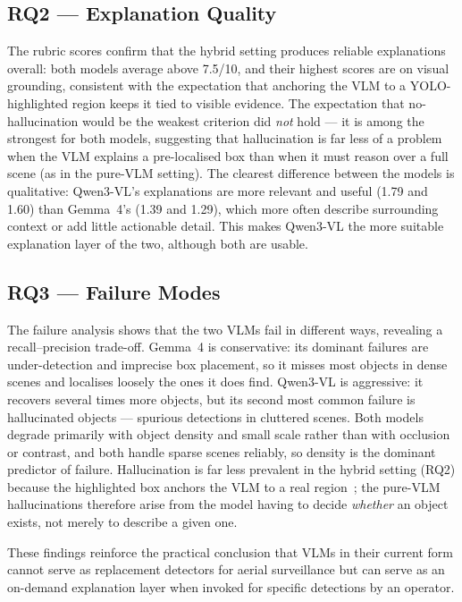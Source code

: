 \documentclass[acmtog, authorversion]{acmart}
\begin{document}
\subsection{RQ2 --- Explanation Quality}

The rubric scores confirm that the hybrid setting produces reliable
explanations overall: both models average above 7.5/10, and their
highest scores are on visual grounding, consistent with the
expectation that anchoring the VLM to a YOLO-highlighted region keeps
it tied to visible evidence. The expectation that no-hallucination
would be the weakest criterion did \emph{not} hold --- it is among the
strongest for both models, suggesting that hallucination is far less of
a problem when the VLM explains a pre-localised box than when it must
reason over a full scene (as in the pure-VLM setting). The clearest
difference between the models is qualitative: Qwen3-VL's explanations
are more relevant and useful (1.79 and 1.60) than Gemma~4's (1.39 and
1.29), which more often describe surrounding context or add little
actionable detail. This makes Qwen3-VL the more suitable explanation
layer of the two, although both are usable.

\subsection{RQ3 --- Failure Modes}

The failure analysis shows that the two VLMs fail in different ways,
revealing a recall--precision trade-off. Gemma~4 is conservative: its
dominant failures are under-detection and imprecise box placement, so
it misses most objects in dense scenes and localises loosely the ones
it does find. Qwen3-VL is aggressive: it recovers several times more
objects, but its second most common failure is hallucinated objects ---
spurious detections in cluttered scenes. Both models degrade primarily
with object density and small scale rather than with occlusion or
contrast, and both handle sparse scenes reliably, so density is the
dominant predictor of failure. Hallucination is far less prevalent in
the hybrid setting (RQ2) because the highlighted box anchors the VLM to
a real region~\cite{li2023pope}; the pure-VLM hallucinations therefore
arise from the model having to decide \emph{whether} an object exists,
not merely to describe a given one.

These findings reinforce the practical conclusion that VLMs in their
current form cannot serve as replacement detectors for aerial
surveillance but can serve as an on-demand explanation layer when
invoked for specific detections by an operator.
\end{document}
